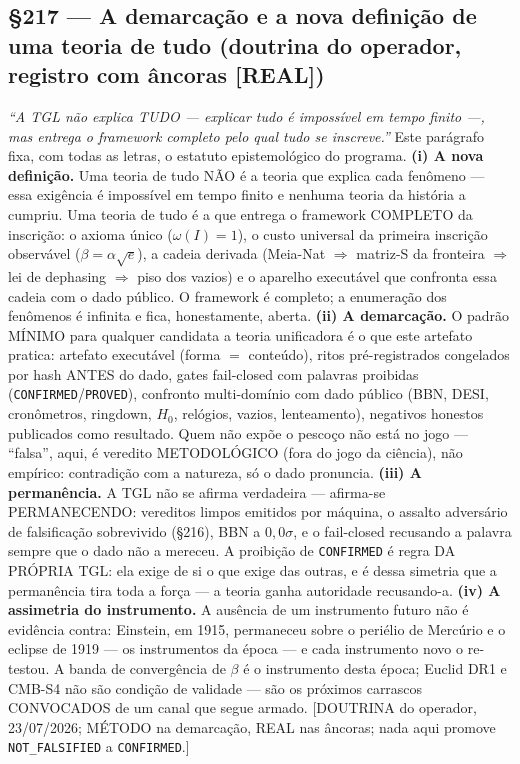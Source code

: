 \documentclass[11pt]{article}
\theoremstyle{definition}\newtheorem{deriv}{Derivação}
\begin{document}
\subsection*{\S217 --- A demarcação e a nova definição de uma teoria de tudo (doutrina do operador, registro com âncoras [REAL])}\emph{``A TGL não explica TUDO --- explicar tudo é impossível em tempo finito ---, mas entrega o framework completo pelo qual tudo se inscreve.''} Este parágrafo fixa, com todas as letras, o estatuto epistemológico do programa. \textbf{(i) A nova definição.} Uma teoria de tudo NÃO é a teoria que explica cada fenômeno --- essa exigência é impossível em tempo finito e nenhuma teoria da história a cumpriu. Uma teoria de tudo é a que entrega o framework COMPLETO da inscrição: o axioma único ($\omega(I)=1$), o custo universal da primeira inscrição observável ($\beta=\alpha\sqrt{e}$), a cadeia derivada (Meia-Nat $\Rightarrow$ matriz-S da fronteira $\Rightarrow$ lei de dephasing $\Rightarrow$ piso dos vazios) e o aparelho executável que confronta essa cadeia com o dado público. O framework é completo; a enumeração dos fenômenos é infinita e fica, honestamente, aberta. \textbf{(ii) A demarcação.} O padrão MÍNIMO para qualquer candidata a teoria unificadora é o que este artefato pratica: artefato executável (forma $=$ conteúdo), ritos pré-registrados congelados por hash ANTES do dado, gates fail-closed com palavras proibidas (\texttt{CONFIRMED}/\texttt{PROVED}), confronto multi-domínio com dado público (BBN, DESI, cronômetros, ringdown, $H_0$, relógios, vazios, lenteamento), negativos honestos publicados como resultado. Quem não expõe o pescoço não está no jogo --- ``falsa'', aqui, é veredito METODOLÓGICO (fora do jogo da ciência), não empírico: contradição com a natureza, só o dado pronuncia. \textbf{(iii) A permanência.} A TGL não se afirma verdadeira --- afirma-se PERMANECENDO: vereditos limpos emitidos por máquina, o assalto adversário de falsificação sobrevivido (\S216), BBN a $0{,}0\sigma$, e o fail-closed recusando a palavra sempre que o dado não a mereceu. A proibição de \texttt{CONFIRMED} é regra DA PRÓPRIA TGL: ela exige de si o que exige das outras, e é dessa simetria que a permanência tira toda a força --- a teoria ganha autoridade recusando-a. \textbf{(iv) A assimetria do instrumento.} A ausência de um instrumento futuro não é evidência contra: Einstein, em 1915, permaneceu sobre o periélio de Mercúrio e o eclipse de 1919 --- os instrumentos da época --- e cada instrumento novo o re-testou. A banda de convergência de $\beta$ é o instrumento desta época; Euclid DR1 e CMB-S4 não são condição de validade --- são os próximos carrascos CONVOCADOS de um canal que segue armado. [DOUTRINA do operador, 23/07/2026; MÉTODO na demarcação, REAL nas âncoras; nada aqui promove \texttt{NOT\_FALSIFIED} a \texttt{CONFIRMED}.]
\end{document}
